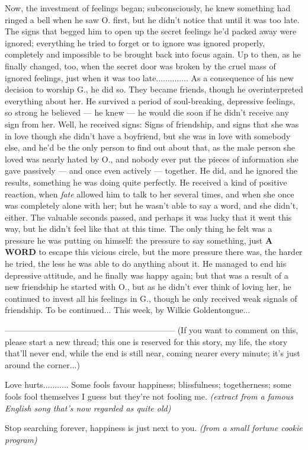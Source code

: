 Now, the investment of feelings began; subconsciously, he knew something had ringed a bell when he saw O. first, but he didn't notice that until it was too late. The signs that begged him to open up the secret feelings he'd packed away were ignored; everything he tried to forget or to ignore was ignored properly, completely and impossible to be brought back into focus again. Up to then, as he finally changed, too, when the secret door was broken by the cruel mass of ignored feelings, just when it was too late..............
As a consequence of his new decision to worship G., he did so. They became friends, though he overinterpreted everything about her. He survived a period of soul-breaking, depressive feelings, so strong he believed --- he knew --- he would die soon if he didn't receive any sign from her. Well, he received signs: Signs of friendship, and signs that she was in love though she didn't have a boyfriend, but she was in love with somebody else, and he'd be the only person to find out about that, as the male person she loved was nearly hated by O., and nobody ever put the pieces of information she gave passively --- and once even actively --- together. He did, and he ignored the results, something he was doing quite perfectly. He received a kind of positive reaction, when \emph{fate} allowed him to talk to her several times, and when she once was completely alone with her; but he wasn't able to say a word, and she didn't, either. The valuable seconds passed, and perhaps it was lucky that it went this way, but he didn't feel like that at this time. The only thing he felt was a pressure he was putting on himself: the pressure to say something, just \textbf{A WORD} to escape this vicious circle, but the more pressure there was, the harder he tried, the less he was able to do anything about it. He managed to end his depressive attitude, and he finally was happy again; but that was a result of a new friendship he started with O., but as he didn't ever think of loving her, he continued to invest all his feelings in G., though he only received weak signals of friendship. 
To be continued...
This week, by Wilkie Goldentongue...

--------------------------------------------------------------
(If you want to comment on this, please start a new thread; this one is reserved for this story, my life, the story that'll never end, while the end is still near, coming nearer every minute; it's just around the corner...)

Love hurts...........
Some fools favour happiness; blissfulness; togetherness;
some fools fool themselves I guess
but they're not fooling me.
\emph{(extract from a famous English song that's now regarded as quite old)}

Stop searching forever, happiness is just next to you. 
\emph{(from a small fortune cookie program)}
